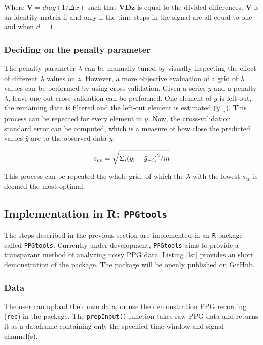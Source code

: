 \documentclass[twocolumn]{bmcart}%
\begin{document}
Where $\mathbf{V} = diag(1/\Delta x)$ such that $ \mathbf{VDz}$ is equal to the divided differences. 
$\mathbf{V}$ is an identity matrix if and only if the time steps in the signal are all equal to one and when $d=1$. 

\subsubsection*{Deciding on the penalty parameter}
The penalty parameter $\lambda$ can be manually tuned by visually inspecting the effect of different $\lambda$ values on $z$.  
However, a more objective evaluation of a grid of $\lambda$ values can be performed by using cross-validation. Given a series $y$ and a penalty $\lambda$, leave-one-out cross-validation can be performed.
One element of $y$ is left out, the remaining data is filtered and the left-out element is estimated ($ \hat{y}_{-i}$). 
This process can be repeated for every element in $y$. 
Now, the cross-validation standard error can be computed, which is a measure of how close the predicted values $\hat{y}$ are to the observed data $y$: 

\begin{equation}
 s_{cv} = \sqrt{{\Sigma_i (y_i - \hat{y}_{-i})}^2/m } $$
\end{equation} 

This process can be repeated the whole grid, of which the $\lambda$ with the lowest $s_{cv}$ is deemed the most optimal. 


\subsection*{Implementation in R: \texttt{PPGtools}}
The steps described in the previous section are implemented in an \verb|R|-package called \verb|PPGtools|. 
Currently under development, \verb|PPGtools| aims to provide a transparant method of analyzing noisy PPG data. 
Listing \ref{lst} provides an short demonstration of the package.
The package will be openly published on GitHub. 

\subsubsection*{Data}
The user can upload their own data, or use the demonstration PPG recording (\verb|rec|) in the package. 
The \verb|prepInput()| function takes raw PPG data and returns it as a dataframe containing only the specified time window and signal channel(s). 
\end{document}
